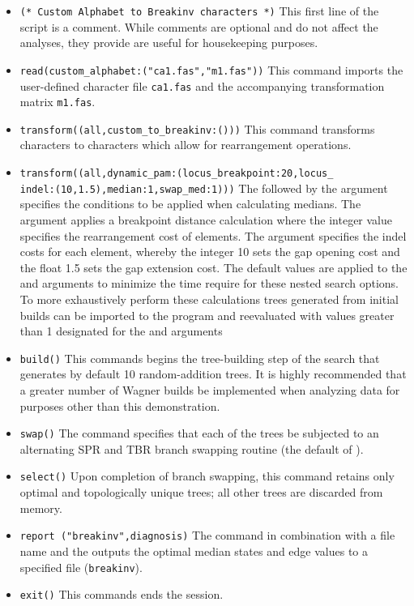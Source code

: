 \begin{itemize}
\item \texttt{(* Custom Alphabet to Breakinv characters  *)} This first line of the script is a comment. While comments are optional and do not affect the analyses, they provide are useful for housekeeping purposes.
\item \texttt{read(custom\_alphabet:("ca1.fas","m1.fas"))} This command imports the user-defined  character file \texttt{ca1.fas} and the accompanying transformation matrix \texttt{m1.fas}.
\item \texttt{transform((all,custom\_to\_breakinv:()))} This command transforms  characters to  characters which allow for rearrangement operations.
\item \texttt{transform((all,dynamic\_pam:(locus\_breakpoint:20,locus\_\\indel:(10,1.5),median:1,swap\_med:1)))}  The  follow\-ed by the argument  specifies the conditions to be applied when calculating medians. The argument  applies a breakpoint distance calculation where the integer value specifies the rearrangement cost of  elements. The argument  specifies the indel costs for each  element, whereby the integer 10 sets the gap opening cost and the float 1.5 sets the gap extension cost.  The default values are applied to the  and  arguments to minimize the time require for these nested search options.   To more exhaustively perform these calculations trees generated from initial builds can be imported to the program and reevaluated with values greater than 1 designated for the  and  arguments
\item \texttt{build()} This commands begins the tree-building step of the search that generates by default 10 random-addition trees.  It is highly recommended that a greater number of Wagner builds be implemented when analyzing data for purposes other than this demonstration.
\item \texttt{swap()} The  command specifies that each of the trees be subjected to an alternating SPR and TBR branch swapping routine (the default of \poy).
\item \texttt{select()} Upon completion of branch swapping, this command retains only optimal and topologically unique trees; all other trees are discarded from memory. 
\item \texttt{report ("breakinv",diagnosis)}  The  command in combination with a file name and the  outputs the optimal median states and edge values to a specified file (\texttt{breakinv}). 
\item \texttt{exit()} This commands ends the \poy session.
\end{itemize}

